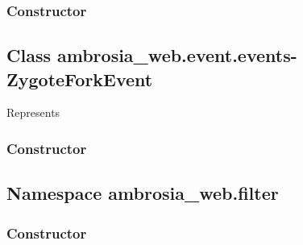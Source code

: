 \documentclass[letterpaper,10pt,english]{sphinxmanual}
\begin{document}
\subsubsection{Constructor}
\label{ambrosia_web.event.events-UnknownFdEvent:constructor}

\begin{fulllineitems}
\label{ambrosia_web.event.events-UnknownFdEvent:ambrosia_web.event.events-UnknownFdEvent}
\end{fulllineitems}



\subsection{Class ambrosia\_web.event.events-ZygoteForkEvent}
\label{ambrosia_web.event.events-ZygoteForkEvent::doc}\label{ambrosia_web.event.events-ZygoteForkEvent:class-ambrosia-web-event-events-zygoteforkevent}
Represents {\hyperref[ambrosia_plugins.lkm:ambrosia_plugins.lkm.events.ZygoteForkEvent]{}}


\subsubsection{Constructor}
\label{ambrosia_web.event.events-ZygoteForkEvent:constructor}

\begin{fulllineitems}
\label{ambrosia_web.event.events-ZygoteForkEvent:ambrosia_web.event.events-ZygoteForkEvent}
\end{fulllineitems}



\subsection{Namespace ambrosia\_web.filter}
\label{ambrosia_web.filter:namespace-ambrosia-web-filter}\label{ambrosia_web.filter::doc}

\subsubsection{Constructor}
\label{ambrosia_web.filter:constructor}
\end{document}
